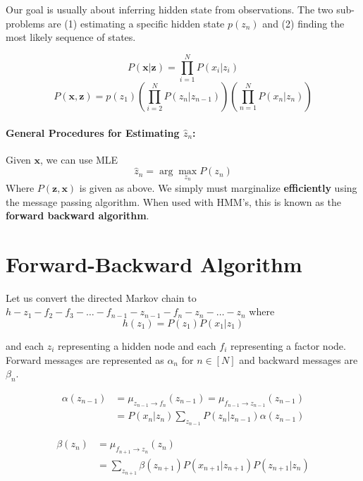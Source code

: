 \documentclass[a4paper,12pt]{report}
\begin{document}
Our goal is usually about inferring hidden state from observations. The two sub-problems are (1) estimating a specific hidden state $p(z_n)$ and (2) finding the most likely sequence of states.

\begin{equation}
P(\pmb x | \pmb z) = \prod_{i = 1}^N P(x_i | z_i)
\end{equation}
\begin{equation}
P(\pmb x, \pmb z) = p(z_1) (\prod_{i = 2}^N P(z_n | z_{n-1})) (\prod_{n=1}^N P(x_n | z_n))
\end{equation}


\paragraph{General Procedures for Estimating $\hat z_n$: } Given $\pmb x$, we can use MLE
\begin{equation}
\hat z_n = \arg\max_{z_n} P(z_n)
\end{equation}
Where $P(\pmb z, \pmb x)$ is given as above. We simply must marginalize \textbf{efficiently} using the message passing algorithm. When used with HMM's, this is known as the \textbf{forward backward algorithm}.

\section{Forward-Backward Algorithm}

Let us convert the directed Markov chain to $h - z_1 - f_2 - f_3 - \dots - f_{n-1} - z_{n-1} - f_n - z_n - \dots - z_n$ where 
\begin{equation}
h(z_1) = P(z_1)P(x_1 | z_1)
\end{equation}

and each $z_i$ representing a hidden node and each $f_i$ representing a factor node. Forward messages are represented as $\alpha_n$ for $n\in [N]$ and backward messages are $\beta_n$.

\begin{equation}
\begin{split}
\alpha(z_{n-1}) &= \mu_{z_{n-1}\to f_n}(z_{n-1}) = \mu_{f_{n-1} \to z_{n-1}}(z_{n-1}) \\
&= P(x_n | z_n) \sum_{z_{n-1}}^{} P(z_n | z_{n-1}) \alpha(z_{n-1})
\end{split}
\end{equation}

\begin{equation}
\begin{split}
\beta(z_n) &= \mu_{f_{n+1}\to z_{n}}(z_n) \\
&= \sum_{z_{n+1}}^{} \beta(z_{n+1})P(x_{n+1} | z_{n+1}) P(z_{n+1} | z_n)
\end{split}
\end{equation}
\end{document}
